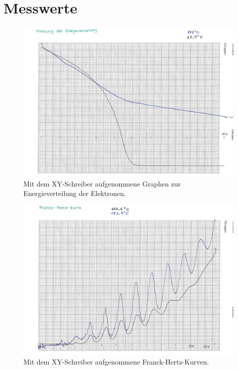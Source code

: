 \section{Messwerte}

\begin{figure}
    \centering
    \includegraphics[width=\textwidth]{content/img/mess_energieverteilung.jpg}
    \caption{Mit dem XY-Schreiber aufgenommene Graphen zur Energieverteilung der Elektronen.}
    \label{fig:mess_energieverteilung}
\end{figure}

\begin{figure}
    \centering
    \includegraphics[width=\textwidth]{content/img/mess_franck_hertz.jpg}
    \caption{Mit dem XY-Schreiber aufgenommene Franck-Hertz-Kurven.}
    \label{fig:mess_franck_hertz}
\end{figure}
